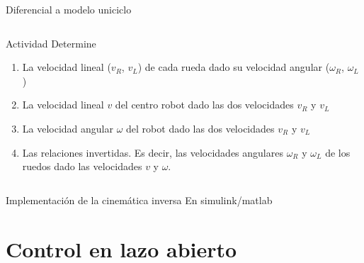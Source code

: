 \documentclass[presentation,aspectratio=169]{beamer}
\begin{document}
\begin{frame}[label={sec:org072d854}]{Diferencial a modelo uniciclo}
\begin{columns}
\begin{column}{0.6\columnwidth}
\alert{Actividad} Determine

\begin{enumerate}
\item La velocidad lineal (\(v_R\), \(v_L\)) de cada rueda dado su velocidad angular (\(\omega_R\), \(\omega_L\))

\item La velocidad lineal \(v\) del centro robot dado las dos velocidades \(v_R\) y \(v_L\)

\item La velocidad angular \(\omega\) del robot dado las dos velocidades \(v_R\) y \(v_L\)

\item Las relaciones invertidas. Es decir, las velocidades angulares \(\omega_R\) y \(\omega_L\) de los ruedos dado las velocidades \(v\) y \(\omega\).
\end{enumerate}
\end{column}
\end{columns}
\end{frame}


\begin{frame}[label={sec:orgdc1e46c}]{Implementación de la cinemática inversa}
En simulink/matlab
\end{frame}


\section{Control en lazo abierto}
\label{sec:org68a6a7f}
\end{document}
